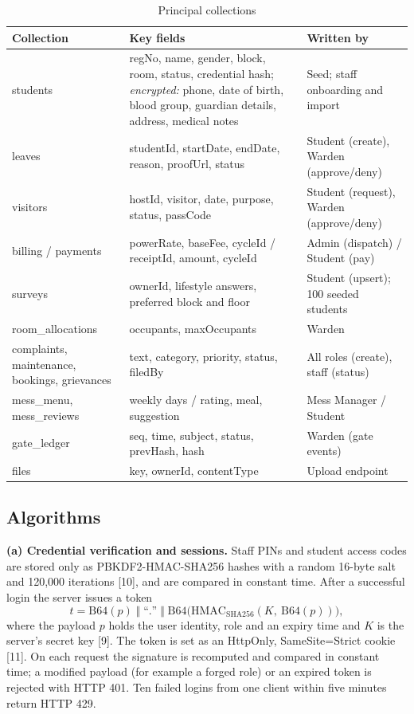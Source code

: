 \documentclass[12pt,a4paper,oneside]{report}
\newcommand{\head}{\rowcolor{headblue}}
\begin{document}
\begin{table}[!htbp]\centering\small
\caption{Principal collections}\label{tab:data}
\begin{tabularx}{\linewidth}{P{1.55in}LP{1.85in}}
\toprule\head \textbf{Collection} & \textbf{Key fields} & \textbf{Written by}\\\midrule
students & regNo, name, gender, block, room, status, credential hash; \textit{encrypted:} phone, date of birth, blood group, guardian details, address, medical notes & Seed; staff onboarding and import\\
leaves & studentId, startDate, endDate, reason, proofUrl, status & Student (create), Warden (approve/deny)\\
visitors & hostId, visitor, date, purpose, status, passCode & Student (request), Warden (approve/deny)\\
billing / payments & powerRate, baseFee, cycleId / receiptId, amount, cycleId & Admin (dispatch) / Student (pay)\\
surveys & ownerId, lifestyle answers, preferred block and floor & Student (upsert); 100 seeded students\\
room\_allocations & occupants, maxOccupants & Warden\\
complaints, maintenance, bookings, grievances & text, category, priority, status, filedBy & All roles (create), staff (status)\\
mess\_menu, mess\_reviews & weekly days / rating, meal, suggestion & Mess Manager / Student\\
gate\_ledger & seq, time, subject, status, prevHash, hash & Warden (gate events)\\
files & key, ownerId, contentType & Upload endpoint\\
\bottomrule
\end{tabularx}
\end{table}

\subsection{Algorithms}\label{sec:algo}
\textbf{(a) Credential verification and sessions.} Staff PINs and student access codes are stored only as
PBKDF2-HMAC-SHA256 hashes with a random 16-byte salt and 120,000 iterations [10], and are compared in constant time.
After a successful login the server issues a token
\begin{equation}
t = \mathrm{B64}(p)\;\Vert\;\text{``.''}\;\Vert\;\mathrm{B64}\big(\mathrm{HMAC}_{\mathrm{SHA256}}(K,\ \mathrm{B64}(p))\big),
\end{equation}
where the payload $p$ holds the user identity, role and an expiry time and $K$ is the server's secret key [9]. The token
is set as an HttpOnly, SameSite=Strict cookie [11]. On each request the signature is recomputed and compared in
constant time; a modified payload (for example a forged role) or an expired token is rejected with HTTP 401. Ten failed
logins from one client within five minutes return HTTP 429.
\end{document}
